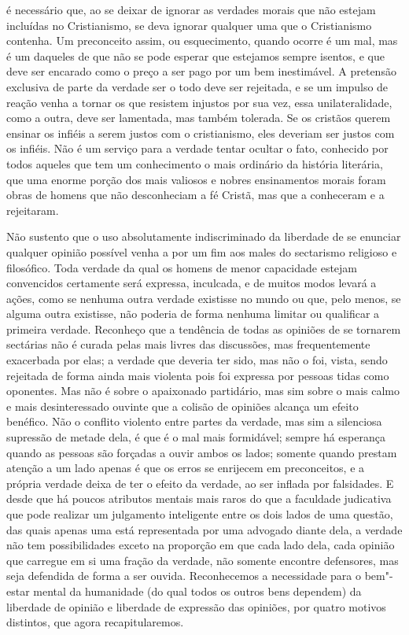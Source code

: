 é necessário que, ao se deixar de ignorar as verdades morais que não
estejam incluídas no Cristianismo, se deva ignorar qualquer uma que o
Cristianismo contenha. Um preconceito assim, ou esquecimento, quando
ocorre é um mal, mas é um daqueles de que não se pode esperar que estejamos
sempre isentos, e que deve ser encarado como o preço a ser pago por um
bem inestimável. A pretensão exclusiva de parte da verdade ser o
todo deve ser rejeitada, e se um impulso de reação venha a tornar os
que resistem injustos por sua vez, essa unilateralidade, como a outra,
deve ser lamentada, mas também tolerada. Se os cristãos querem ensinar
os infiéis a serem justos com o cristianismo, eles deveriam ser justos
com os infiéis. Não é um serviço para a verdade tentar ocultar o fato,
conhecido por todos aqueles que tem um conhecimento o mais ordinário da
história literária, que uma enorme porção dos mais valiosos e nobres
ensinamentos morais foram obras de homens que não desconheciam a fé
Cristã, mas que a conheceram e a rejeitaram. 

Não sustento que o uso absolutamente indiscriminado da liberdade de se
enunciar qualquer opinião possível venha a por um fim aos males do
sectarismo religioso e filosófico. Toda verdade da qual os homens de
menor capacidade estejam convencidos certamente será expressa,
inculcada, e de muitos modos levará a ações, como se nenhuma outra
verdade existisse no mundo ou que, pelo menos, se alguma outra
existisse, não poderia de forma nenhuma limitar ou qualificar a
primeira verdade. Reconheço que a tendência de todas as opiniões de se
tornarem sectárias não é curada pelas mais livres das discussões, mas
frequentemente exacerbada por elas; a verdade que deveria ter sido, mas
não o foi, vista, sendo rejeitada de forma ainda mais violenta pois foi
expressa por pessoas tidas como oponentes. Mas não é sobre o apaixonado
partidário, mas sim sobre o mais calmo e mais desinteressado ouvinte que
a colisão de opiniões alcança um efeito benéfico. Não o conflito
violento entre partes da verdade, mas sim a silenciosa supressão de
metade dela, é que é o mal mais formidável; sempre há esperança quando as pessoas são
forçadas a ouvir ambos os lados; somente quando prestam atenção a um
lado apenas é que os erros se enrijecem em preconceitos, e a própria
verdade deixa de ter o efeito da verdade, ao ser inflada por falsidades.
E desde que há poucos atributos mentais mais raros do que a faculdade
judicativa que pode realizar um julgamento inteligente entre os dois
lados de uma questão, das quais apenas uma está representada por uma
advogado diante dela, a verdade não tem possibilidades exceto na
proporção em que cada lado dela, cada opinião que carregue em si uma
fração da verdade, não somente encontre defensores, mas seja defendida de
forma a ser ouvida.
\linebreak
Reconhecemos a necessidade para o bem"-estar mental da
humanidade (do qual todos os outros bens dependem) da liberdade
de opinião e liberdade de expressão das opiniões, por quatro motivos
distintos, que agora recapitularemos. 

